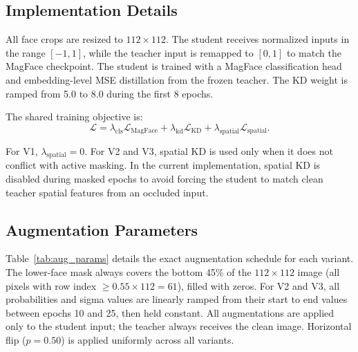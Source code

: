 \subsection{Implementation Details}

All face crops are resized to $112 \times 112$. The student receives normalized inputs in the range $[-1,1]$, while the teacher input is remapped to $[0,1]$ to match the MagFace checkpoint. The student is trained with a MagFace classification head and embedding-level MSE distillation from the frozen teacher. The KD weight is ramped from 5.0 to 8.0 during the first 8 epochs.

The shared training objective is:
\begin{equation}
    \mathcal{L}
    =
    \lambda_{\mathrm{cls}}\mathcal{L}_{\mathrm{MagFace}}
    +
    \lambda_{\mathrm{kd}}\mathcal{L}_{\mathrm{KD}}
    +
    \lambda_{\mathrm{spatial}}\mathcal{L}_{\mathrm{spatial}} .
\end{equation}

For V1, $\lambda_{\mathrm{spatial}}=0$. For V2 and V3, spatial KD is used only when it does not conflict with active masking. In the current implementation, spatial KD is disabled during masked epochs to avoid forcing the student to match clean teacher spatial features from an occluded input.

\subsection{Augmentation Parameters}

Table~\ref{tab:aug_params} details the exact augmentation schedule for each variant. The lower-face mask always covers the bottom 45\% of the $112\times 112$ image (all pixels with row index $\ge 0.55 \times 112 = 61$), filled with zeros. For V2 and V3, all probabilities and sigma values are linearly ramped from their start to end values between epochs 10 and 25, then held constant. All augmentations are applied only to the student input; the teacher always receives the clean image. Horizontal flip ($p = 0.50$) is applied uniformly across all variants.


